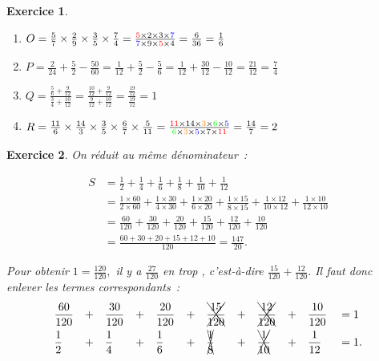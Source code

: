\documentclass[10pt]{article}
\newtheorem{exo}{Exercice}
\begin{document}
\begin{exo}
\begin{multicols}{2}
\begin{enumerate}
\item $O=\frac{5}{7}\times\frac{2}{9}\times\frac{3}{5}\times\frac{7}{4}
=\frac{\textcolor{red}{5}\times 2\times 3\times \textcolor{blue}{7}}{\textcolor{blue}{7}\times 9\times \textcolor{red}{5}\times 4}=\frac{6}{36}=\frac{1}{6}$
\item $ P=\frac{2}{24}+\frac{5}{2}-\frac{50}{60}=\frac{1}{12}+\frac{5}{2}-\frac{5}{6}=
\frac{1}{12}+\frac{30}{12}-\frac{10}{12}=\frac{21}{12}=\frac{7}{4}$
\item $ Q=\frac{\frac{5}{6}+\frac{9}{12}}{\frac{3}{4}+\frac{10}{12}}
=\frac{\frac{10}{12}+\frac{9}{12}}{\frac{9}{12}+\frac{10}{12}}
=\frac{\frac{19}{12}}{\frac{19}{12}}=1$
\item $ R=\frac{11}{6}\times\frac{14}{3}\times\frac{3}{5}\times\frac{6}{7}\times\frac{5}{11}=\frac{\textcolor{red}{11}\times 14\times \textcolor{orange}{3}\times \textcolor{green}{6}\times \textcolor{blue}{5}}{\textcolor{green}{6}\times \textcolor{orange}{3}\times \textcolor{blue}{5}\times 7\times \textcolor{red}{11}}=\frac{14}{7}=2$
\end{enumerate}
\end{multicols}


\end{exo}

\begin{exo}

On réduit au même dénominateur~:

\begin{align*}
S&=\frac{1}{2}+\frac{1}{4}+\frac{1}{6}+\frac{1}{8}+\frac{1}{10}+\frac{1}{12}\\
&=\frac{1\times 60}{2\times 60}+\frac{1\times 30}{4\times 30}+\frac{1\times 20}{6\times 20}+\frac{1\times  15}{8\times 15}+\frac{1\times 12}{10\times 12}+\frac{1\times 10}{12\times 10}\\
&=\frac{60}{120}+\frac{30}{120}+\frac{20}{120}+\frac{15}{120}+\frac{12}{120}+\frac{10}{120}\\
&=\frac{60+30+20+15+12+10}{120}=\frac{147}{20}.
\end{align*}

Pour obtenir $1=\frac{120}{120},$ il y a $\frac{27}{120}$ \og en trop \fg, c'est-à-dire $\frac{15}{120}+\frac{12}{120}.$ Il faut donc enlever les termes correspondants~:
\begin{align*}&\frac{60}{120}&&+&&\frac{30}{120}&&+&&\frac{20}{120}&&+&&\xcancel{\frac{15}{120}}&&+&&\xcancel{\frac{12}{120}}&&+&&\frac{10}{120}&&=1\\
&\frac{1}{2}&&+&&\frac{1}{4}&&+&&\frac{1}{6}&&+&&\xcancel{\frac{1}{8}}&&+&&\xcancel{\frac{1}{10}}&&+&&\frac{1}{12}&&=1.
\end{align*}
\end{exo}
\end{document}
